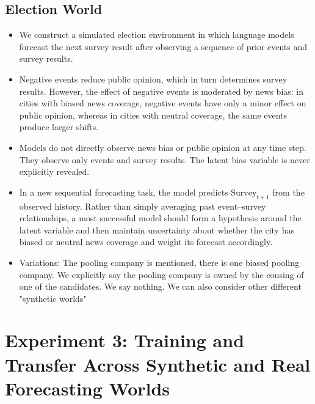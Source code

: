 \documentclass{article}
\begin{document}
\subsection{Election World}
\begin{itemize}
    \item  We construct a simulated election environment in which language models forecast the next survey result after observing a sequence of prior events and survey results.

    \item Negative events reduce public opinion, which in turn determines survey results. However, the effect of negative events is moderated by news bias: in cities with biased news coverage, negative events have only a minor effect on public opinion, whereas in cities with neutral coverage, the same events produce larger shifts.

    \item Models do not directly observe news bias or public opinion at any time step. They observe only events and survey results. The latent bias variable is never explicitly revealed.

    \item  In a new sequential forecasting task, the model predicts $\text{Survey}_{t+1}$ from the observed history. Rather than simply averaging past event--survey relationships, a most successful model should form a hypothesis around the latent variable and then maintain uncertainty about whether the city has biased or neutral news coverage and weight its forecast accordingly.

    \item Variations: The pooling company is mentioned,  there is one biased pooling company. We explicitly say the pooling company is owned by the cousing of one of the candidates. We say nothing.  We can also consider other different "synthetic worlds"



\end{itemize}

\newpage


\section{Experiment 3: Training and Transfer Across Synthetic and Real Forecasting Worlds}
\end{document}
